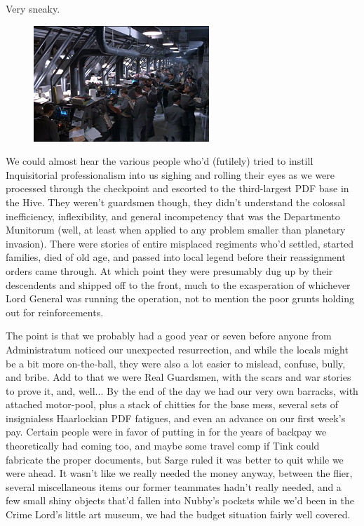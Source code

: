Very sneaky.

\begin{figure}
	\begin{center}
		\includegraphics[width=\figwidth]{pics/19/20.png}
	\end{center}
\end{figure}
We could almost hear the various people who'd (futilely) tried to instill Inquisitorial professionalism into us sighing and rolling their eyes as we were processed through the checkpoint and escorted to the third-largest PDF base in the Hive. 
They weren't guardsmen though, they didn't understand the colossal inefficiency, inflexibility, and general incompetency that was the Departmento Munitorum (well, at least when applied to any problem smaller than planetary invasion). 
There were stories of entire misplaced regiments who'd settled, started families, died of old age, and passed into local legend before their reassignment orders came through. 
At which point they were presumably dug up by their descendents and shipped off to the front, much to the exasperation of whichever Lord General was running the operation, not to mention the poor grunts holding out for reinforcements. 


The point is that we probably had a good year or seven before anyone from Administratum noticed our unexpected resurrection, and while the locals might be a bit more on-the-ball, they were also a lot easier to mislead, confuse, bully, and bribe. 
Add to that we were Real Guardsmen, with the scars and war stories to prove it, and, well... 
By the end of the day we had our very own barracks, with attached motor-pool, plus a stack of chitties for the base mess, several sets of insignialess Haarlockian PDF fatigues, and even an advance on our first week's pay. 
Certain people were in favor of putting in for the years of backpay we theoretically had coming too, and maybe some travel comp if Tink could fabricate the proper documents, but Sarge ruled it was better to quit while we were ahead. 
It wasn't like we really needed the money anyway, between the flier, several miscellaneous items our former teammates hadn't really needed, and a few small shiny objects that'd fallen into Nubby's pockets while we'd been in the Crime Lord's little art museum, we had the budget situation fairly well covered.


